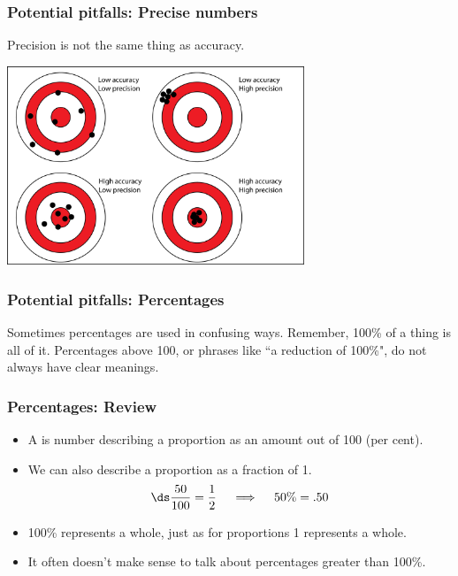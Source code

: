 \documentclass[xcolor=table, handout]{beamer}
\begin{document}
\begin{frame}
\frametitle{Potential pitfalls: Precise numbers}

\begin{block}{}
Precision is not the same thing as accuracy.
\end{block}

\begin{center}
\includegraphics[width=3.5in]{../images/precision_accuracy}
\end{center}
\end{frame}

\begin{frame}
\frametitle{Potential pitfalls: Percentages}

\begin{block}{}
Sometimes percentages are used in confusing ways. Remember, 100\% of a thing is all of it. Percentages above 100, or phrases like ``a reduction of 100\%", do not always have clear meanings. 
\end{block}


\end{frame}

\begin{frame}
\frametitle{Percentages: Review}

\begin{block}{}
\begin{itemize}
\item A  is number describing a proportion as an amount out of 100 (per cent).
\pause
\item We can also describe a proportion as a fraction of 1.
\[\ds \frac {50}{100} = \frac 1 2 \quad \implies \quad 50\% = .50\]
\pause
\item 100\% represents a whole, just as for proportions 1 represents a whole.
\pause
\item It often doesn't make sense to talk about percentages greater than 100\%.
\end{itemize}
\end{block}
\end{frame}
\end{document}
